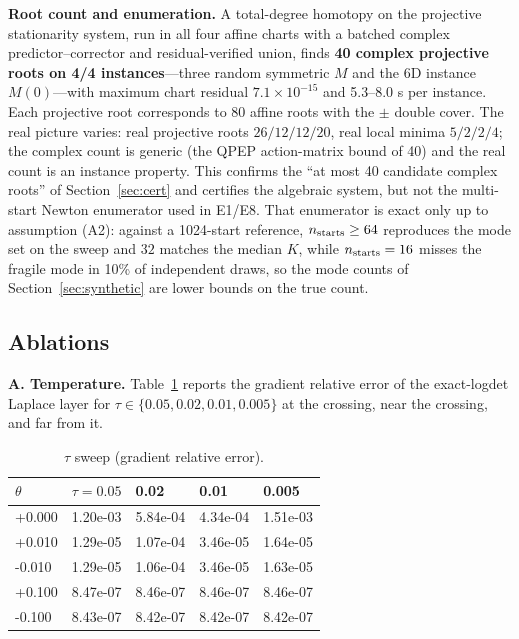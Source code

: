 \textbf{Root count and enumeration.} A total-degree homotopy on the projective stationarity system, run in all four affine charts with a batched complex predictor--corrector and residual-verified union, finds \textbf{40 complex projective roots on 4/4 instances}---three random symmetric $M$ and the 6D instance $M(0)$---with maximum chart residual $7.1\times10^{-15}$ and 5.3--8.0 s per instance. Each projective root corresponds to 80 affine roots with the $\pm$ double cover. The real picture varies: real projective roots $26/12/12/20$, real local minima $5/2/2/4$; the complex count is generic (the QPEP action-matrix bound of 40) and the real count is an instance property. This confirms the ``at most 40 candidate complex roots'' of Section~\ref{sec:cert} and certifies the algebraic system, but not the multi-start Newton enumerator used in E1/E8. That enumerator is exact only up to assumption (A2): against a 1024-start reference, $n_{\rm starts}\ge64$ reproduces the mode set on the sweep and $32$ matches the median $K$, while $n_{\rm starts}=16$ misses the fragile mode in 10\% of independent draws, so the mode counts of Section~\ref{sec:synthetic} are lower bounds on the true count.\label{sec:enumeration}

\subsection{Ablations}\label{sec:ablations}

\textbf{A. Temperature.} Table~\ref{tab:tau} reports the gradient relative error of the exact-logdet Laplace layer for $\tau\in\{0.05,0.02,0.01,0.005\}$ at the crossing, near the crossing, and far from it.

\begin{table}[t]
\centering
\caption{$\tau$ sweep (gradient relative error).}
\label{tab:tau}
\footnotesize
\setlength{\tabcolsep}{4pt}
\begin{tabular}{@{}l l l l l@{}}
\toprule
$\theta$ & $\tau=0.05$ & 0.02 & 0.01 & 0.005\\
\midrule
+0.000 & 1.20e-03 & 5.84e-04 & 4.34e-04 & 1.51e-03\\
+0.010 & 1.29e-05 & 1.07e-04 & 3.46e-05 & 1.64e-05\\
-0.010 & 1.29e-05 & 1.06e-04 & 3.46e-05 & 1.63e-05\\
+0.100 & 8.47e-07 & 8.46e-07 & 8.46e-07 & 8.46e-07\\
-0.100 & 8.43e-07 & 8.42e-07 & 8.42e-07 & 8.42e-07\\
\bottomrule
\end{tabular}
\end{table}

